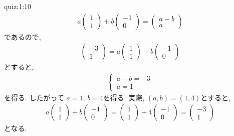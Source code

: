 \begin{answerof}{quiz:1:10}
  \begin{align*}
    a\begin{pmatrix}
      1\\1
    \end{pmatrix}
    +b\begin{pmatrix}
      -1\\0
    \end{pmatrix}
    =
    \begin{pmatrix}
      a-b\\a
    \end{pmatrix}
  \end{align*}
  であるので,
  \begin{align*}
    \begin{pmatrix}
      -3\\1
    \end{pmatrix}
    =
    a\begin{pmatrix}
      1\\1
    \end{pmatrix}
    +b\begin{pmatrix}
      -1\\0
    \end{pmatrix}
  \end{align*}
  とすると,
  \begin{align*}
    \begin{cases}
      a-b=-3\\a=1
    \end{cases}
  \end{align*}
  を得る.
  したがって
  $a=1$, $b=4$を得る.
  実際,
  $(a,b)=(1,4)$とすると,
  \begin{align*}
    a\begin{pmatrix}
      1\\1
    \end{pmatrix}
    +b\begin{pmatrix}
      -1\\0
    \end{pmatrix}
    =
    \begin{pmatrix}
      1\\1
    \end{pmatrix}
    +4\begin{pmatrix}
      -1\\0
    \end{pmatrix}
    =
    \begin{pmatrix}
      -3\\1
    \end{pmatrix}
  \end{align*}
  となる.
\end{answerof}

